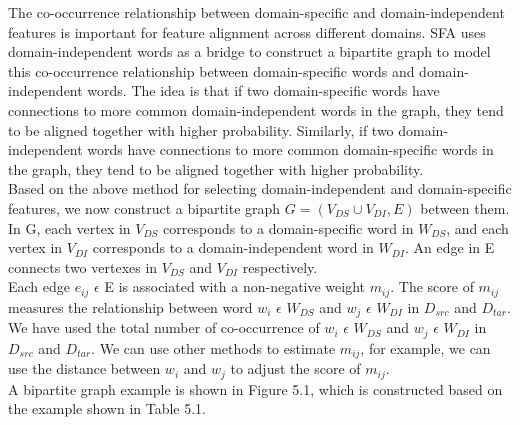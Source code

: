 \documentclass{report}
\begin{document}
The co-occurrence relationship between domain-specific and domain-independent features is important for feature alignment across different domains. SFA uses domain-independent words as a bridge to construct a bipartite graph to model this co-occurrence relationship between domain-specific words and domain-independent words. The idea is that if two domain-specific words have connections to more common domain-independent words in the graph, they tend to be aligned together with higher probability. Similarly, if two domain-independent words have connections to more common domain-specific words in the graph, they tend to be aligned together with higher probability.\\
\linebreak
Based on the above method for selecting domain-independent and domain-specific features, we now construct a bipartite graph
\(G = (V_{DS} \cup V_{DI}, E)\) between them. In G, each vertex in \(V_{DS}\)
corresponds to a domain-specific word in \(W_{DS}\), and each vertex in
\(V_{DI}\) corresponds to a domain-independent word in \(W_{DI}\). An edge
in E connects two vertexes in \(V_{DS}\) and \(V_{DI}\) respectively.\\
\linebreak
Each edge \(e_{ij}\) \(\epsilon\) E is associated with a non-negative weight \(m_{ij}\). The score of \(m_{ij}\) measures the relationship between word \(w_i\) \(\epsilon\) \(W_{DS}\) and \(w_j\) \(\epsilon\) \(W_{DI}\) in \(D_{src}\) and \(D_{tar}\).
We have used the total number of co-occurrence of \(w_i\) \(\epsilon\) \(W_{DS}\) and \(w_j\) \(\epsilon\) \(W_{DI}\) in \(D_{src}\) and \(D_{tar}\). We can use other methods to estimate \(m_{ij}\), for example, we can use the distance between \(w_i\) and \(w_j\) to adjust the score of \(m_{ij}\).\\\linebreak
A bipartite graph example is shown in Figure 5.1, which is constructed based on the example shown in Table 5.1.\\
\end{document}
